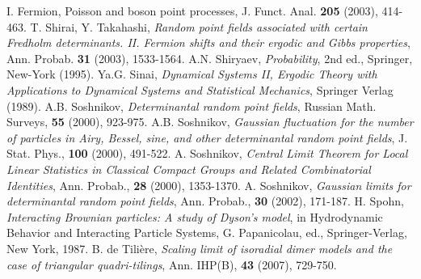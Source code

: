 \documentclass{article}
\numberwithin{equation}{section}
\begin{document}
\begin{thebibliography}{0}
{I. Fermion, Poisson and boson point processes},
J. Funct. Anal. {\bf 205} (2003), 414-463.
 T. Shirai, Y. Takahashi, {\it Random point fields associated with certain Fredholm determinants.
II. Fermion shifts and their ergodic and Gibbs properties},
Ann. Probab. {\bf 31}
(2003), 1533-1564.
 A.N. Shiryaev, {\it Probability}, 2nd ed., Springer,  New-York (1995).
 Ya.G. Sinai, {\it 
Dynamical Systems II, 
Ergodic Theory with Applications to Dynamical Systems and Statistical Mechanics}, Springer Verlag (1989).
 A.B. Soshnikov, {\it Determinantal random point fields}, Russian Math. Surveys, {\bf 55} (2000), 923-975.
 A.B. Soshnikov, {\it Gaussian fluctuation for the number of particles in Airy, Bessel, sine, and other determinantal
    random point fields}, J. Stat. Phys., {\bf 100} (2000), 491-522.
 A. Soshnikov,
{\it Central Limit Theorem for Local Linear Statistics in Classical Compact Groups and
Related Combinatorial Identities}, Ann. Probab., {\bf 28} (2000), 1353-1370.
 A. Soshnikov, {\it Gaussian limits for determinantal random point fields}, Ann. Probab., {\bf 30} (2002), 171-187.
 H. Spohn, {\it Interacting Brownian particles: A study of Dyson's
model}, in Hydrodynamic Behavior and Interacting Particle Systems, G. Papanicolau, ed., Springer-Verlag, New York, 1987.
 B. de Tili\`ere,
{\it Scaling limit of isoradial dimer models and the case of triangular quadri-tilings}, Ann. IHP(B), {\bf 43} (2007), 729-750. 

\end{thebibliography}
\end{document}
